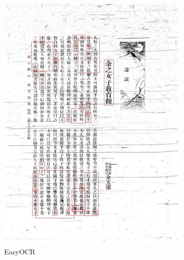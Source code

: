 \documentclass[12pt,twoside]{report}
\begin{document}
\begin{figure}[htbp]
\begin{subfigure}[b]{0.23\linewidth}
        \includegraphics[width=\linewidth]{./figures/samples/easy_01.jpg}
        \caption{EasyOCR}
        \label{fig:easy_01}
    \end{subfigure}
    \hfill
    \begin{subfigure}[b]{0.23\linewidth}

\end{subfigure}
\end{figure}
\end{document}

